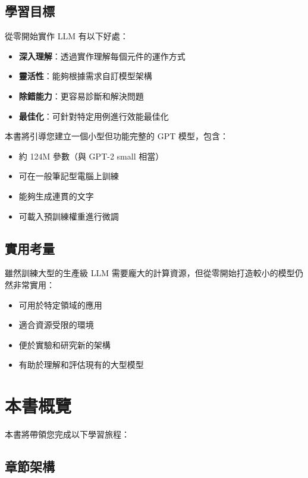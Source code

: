 \subsection{學習目標}

從零開始實作 LLM 有以下好處：

\begin{itemize}
    \item \textbf{深入理解}：透過實作理解每個元件的運作方式
    \item \textbf{靈活性}：能夠根據需求自訂模型架構
    \item \textbf{除錯能力}：更容易診斷和解決問題
    \item \textbf{最佳化}：可針對特定用例進行效能最佳化
\end{itemize}

\begin{example}
本書將引導您建立一個小型但功能完整的 GPT 模型，包含：
\begin{itemize}
    \item 約 124M 參數（與 GPT-2 small 相當）
    \item 可在一般筆記型電腦上訓練
    \item 能夠生成連貫的文字
    \item 可載入預訓練權重進行微調
\end{itemize}
\end{example}

\subsection{實用考量}

雖然訓練大型的生產級 LLM 需要龐大的計算資源，但從零開始打造較小的模型仍然非常實用：

\begin{itemize}
    \item 可用於特定領域的應用
    \item 適合資源受限的環境
    \item 便於實驗和研究新的架構
    \item 有助於理解和評估現有的大型模型
\end{itemize}

\section{本書概覽}

本書將帶領您完成以下學習旅程：

\subsection{章節架構}

